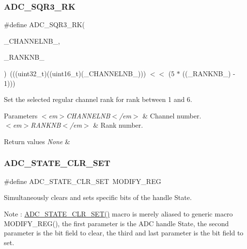 \subsubsection{\texorpdfstring{ADC\_SQR3\_RK}{ADC\_SQR3\_RK}}
{\footnotesize\ttfamily \#define A\+D\+C\+\_\+\+S\+Q\+R3\+\_\+\+RK(\begin{DoxyParamCaption}\item[{}]{\+\_\+\+C\+H\+A\+N\+N\+E\+L\+N\+B\+\_\+,  }\item[{}]{\+\_\+\+R\+A\+N\+K\+N\+B\+\_\+ }\end{DoxyParamCaption})~(((uint32\+\_\+t)((uint16\+\_\+t)(\+\_\+\+C\+H\+A\+N\+N\+E\+L\+N\+B\+\_\+))) $<$$<$ (5 $\ast$ ((\+\_\+\+R\+A\+N\+K\+N\+B\+\_\+) -\/ 1)))}



Set the selected regular channel rank for rank between 1 and 6. 


\begin{DoxyParams}{Parameters}
{\em $<$em$>$\+C\+H\+A\+N\+N\+E\+L\+N\+B$<$/em$>$} & Channel number. \\
\hline
{\em $<$em$>$\+R\+A\+N\+K\+N\+B$<$/em$>$} & Rank number.\\
\hline
\end{DoxyParams}

\begin{DoxyRetVals}{Return values}
{\em None} & \\
\hline
\end{DoxyRetVals}
\mbox{\label{group___a_d_c___private___macros_gaaf93e91b164d4a220aae475eff82665f}} 
\subsubsection{\texorpdfstring{ADC\_STATE\_CLR\_SET}{ADC\_STATE\_CLR\_SET}}
{\footnotesize\ttfamily \#define A\+D\+C\+\_\+\+S\+T\+A\+T\+E\+\_\+\+C\+L\+R\+\_\+\+S\+ET~M\+O\+D\+I\+F\+Y\+\_\+\+R\+EG}



Simultaneously clears and sets specific bits of the handle State. 

\begin{DoxyNote}{Note}
\+: \mbox{\hyperlink{group___a_d_c___private___macros_gaaf93e91b164d4a220aae475eff82665f}{A\+D\+C\+\_\+\+S\+T\+A\+T\+E\+\_\+\+C\+L\+R\+\_\+\+S\+E\+T()}} macro is merely aliased to generic macro M\+O\+D\+I\+F\+Y\+\_\+\+R\+E\+G(), the first parameter is the A\+DC handle State, the second parameter is the bit field to clear, the third and last parameter is the bit field to set. 
\end{DoxyNote}

